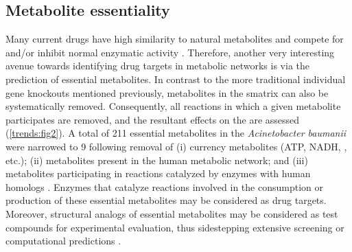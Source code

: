 \subsection{Metabolite essentiality}
Many current drugs have high similarity to natural metabolites and 
compete for and/or inhibit normal enzymatic activity \cite{Dobson:2009kg}. Therefore, 
another very interesting avenue towards identifying drug targets 
in metabolic networks is via the prediction of essential metabolites. 
In contrast to the more traditional individual gene knockouts 
mentioned previously, metabolites in the \gls{smatrix} can also be 
systematically removed. Consequently, all reactions in which a 
given metabolite participates are removed, and the resultant 
effects on the  are assessed (\autoref{trends:fig2}). A total of 
211 essential metabolites in the \textit{Acinetobacter baumanii} 
 were narrowed to 9 following removal of (i) currency 
metabolites (ATP, NADH, , etc.); (ii) metabolites present in 
the human metabolic network; and (iii) metabolites participating 
in reactions catalyzed by enzymes with human homologs \cite{Kim:2010cu}. 
Enzymes that catalyze reactions involved in the consumption or 
production of these essential metabolites may be considered 
as drug targets. Moreover, structural analogs of essential 
metabolites may be considered as test compounds for experimental 
evaluation, thus sidestepping extensive screening or 
computational predictions \cite{Kim:2011jm}.

